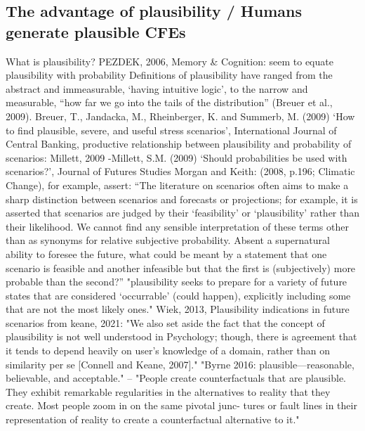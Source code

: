 \subsection{The advantage of plausibility / Humans generate plausible CFEs}\label{subsubsec:psychoCFs_plausible}

\textcolor{ACMDarkBlue}{
What is plausibility?
PEZDEK, 2006, Memory \& Cognition: seem to equate plausibility with probability
}\textcolor{ACMDarkBlue}{
Definitions of plausibility have ranged from the abstract and immeasurable, ‘having intuitive logic’, to the narrow and measurable, “how far we go into the tails of the distribution” (Breuer et al., 2009). Breuer, T., Jandacka, M., Rheinberger, K. and Summerb, M. (2009) ‘How to find plausible, severe, and useful stress scenarios’, International Journal of Central Banking, 
}\textcolor{ACMDarkBlue}{
productive relationship between plausibility and probability of scenarios: Millett, 2009 -Millett, S.M. (2009) ‘Should probabilities be used with scenarios?’, Journal of Futures Studies 
}\textcolor{ACMDarkBlue}{
Morgan and Keith: (2008, p.196; Climatic Change), for example, assert: “The literature on scenarios often aims to make a sharp distinction between scenarios and forecasts or projections; for example, it is asserted that scenarios are judged by their ‘feasibility’ or ‘plausibility’ rather than their likelihood. We cannot find any sensible interpretation of these terms other than as synonyms for relative subjective probability. Absent a supernatural ability to foresee the future, what could be meant by a statement that one scenario is feasible and another infeasible but that the first is (subjectively) more probable than the second?” 
}\textcolor{ACMDarkBlue}{
"plausibility seeks to prepare for a variety of future states that are considered ‘occurrable’ (could happen), explicitly including some that are not the most likely ones." Wiek, 2013, Plausibility indications in future scenarios
}\textcolor{ACMDarkBlue}{
from keane, 2021: "We also set aside the fact that the concept of plausibility is not well understood in Psychology; though, there is agreement that it tends to depend heavily on user’s knowledge of a domain, rather than on similarity per se [Connell and Keane, 2007]."
}\textcolor{ACMDarkBlue}{
"Byrne 2016: plausible—reasonable, believable, and acceptable." -- "People create counterfactuals that are plausible. They exhibit remarkable regularities in the alternatives to reality that they create. Most people zoom in on the same pivotal junc- tures or fault lines in their representation of reality to create a counterfactual alternative to it."
}
